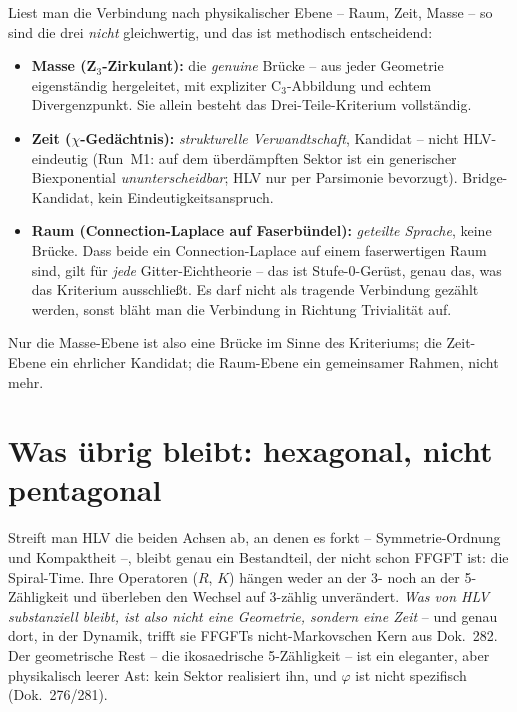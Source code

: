 \begin{important}
Liest man die Verbindung nach physikalischer Ebene -- Raum, Zeit, Masse -- so sind
die drei \emph{nicht} gleichwertig, und das ist methodisch entscheidend:
\begin{itemize}
\item \textbf{Masse (Z$_3$-Zirkulant):} die \emph{genuine} Brücke -- aus jeder
Geometrie eigenständig hergeleitet, mit expliziter C$_3$-Abbildung und echtem
Divergenzpunkt. Sie allein besteht das Drei-Teile-Kriterium vollständig.
\item \textbf{Zeit ($\chi$-Gedächtnis):} \emph{strukturelle Verwandtschaft},
Kandidat -- nicht HLV-eindeutig (Run~M1: auf dem überdämpften Sektor ist ein
generischer Biexponential \emph{ununterscheidbar}; HLV nur per Parsimonie bevorzugt).
Bridge-Kandidat, kein Eindeutigkeitsanspruch.
\item \textbf{Raum (Connection-Laplace auf Faserbündel):} \emph{geteilte Sprache},
keine Brücke. Dass beide ein Connection-Laplace auf einem faserwertigen Raum sind,
gilt für \emph{jede} Gitter-Eichtheorie -- das ist Stufe-0-Gerüst, genau das, was das
Kriterium ausschließt. Es darf nicht als tragende Verbindung gezählt werden, sonst
bläht man die Verbindung in Richtung Trivialität auf.
\end{itemize}
Nur die Masse-Ebene ist also eine Brücke im Sinne des Kriteriums; die Zeit-Ebene ein
ehrlicher Kandidat; die Raum-Ebene ein gemeinsamer Rahmen, nicht mehr.
\end{important}

\section{Was übrig bleibt: hexagonal, nicht pentagonal}

Streift man HLV die beiden Achsen ab, an denen es forkt -- Symmetrie-Ordnung und
Kompaktheit --, bleibt genau ein Bestandteil, der nicht schon FFGFT ist: die
Spiral-Time. Ihre Operatoren ($R$, $K$) hängen weder an der 3- noch an der
5-Zähligkeit und überleben den Wechsel auf 3-zählig unverändert. \emph{Was von HLV
substanziell bleibt, ist also nicht eine Geometrie, sondern eine Zeit} -- und genau
dort, in der Dynamik, trifft sie FFGFTs nicht-Markovschen Kern aus Dok.~282. Der
geometrische Rest -- die ikosaedrische 5-Zähligkeit -- ist ein eleganter, aber
physikalisch leerer Ast: kein Sektor realisiert ihn, und $\varphi$ ist nicht
spezifisch (Dok.~276/281).

